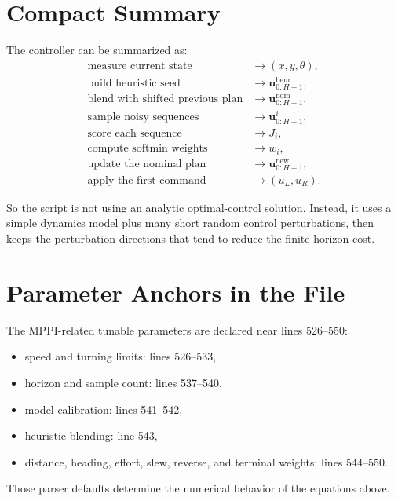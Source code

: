 \documentclass[11pt]{article}
\begin{document}
\section{Compact Summary}

The controller can be summarized as:
\begin{align*}
\text{measure current state} &\to (x,y,\theta), \\
\text{build heuristic seed} &\to \mathbf{u}^{\mathrm{heur}}_{0:H-1}, \\
\text{blend with shifted previous plan} &\to \mathbf{u}^{\mathrm{nom}}_{0:H-1}, \\
\text{sample noisy sequences} &\to \mathbf{u}^i_{0:H-1}, \\
\text{score each sequence} &\to J_i, \\
\text{compute softmin weights} &\to w_i, \\
\text{update the nominal plan} &\to \mathbf{u}^{\mathrm{new}}_{0:H-1}, \\
\text{apply the first command} &\to (u_L, u_R).
\end{align*}

So the script is not using an analytic optimal-control solution. Instead, it
uses a simple dynamics model plus many short random control perturbations, then
keeps the perturbation directions that tend to reduce the finite-horizon cost.

\section{Parameter Anchors in the File}

The MPPI-related tunable parameters are declared near lines 526--550:
\begin{itemize}
\item speed and turning limits: lines 526--533,
\item horizon and sample count: lines 537--540,
\item model calibration: lines 541--542,
\item heuristic blending: line 543,
\item distance, heading, effort, slew, reverse, and terminal weights:
      lines 544--550.
\end{itemize}

Those parser defaults determine the numerical behavior of the equations above.
\end{document}
